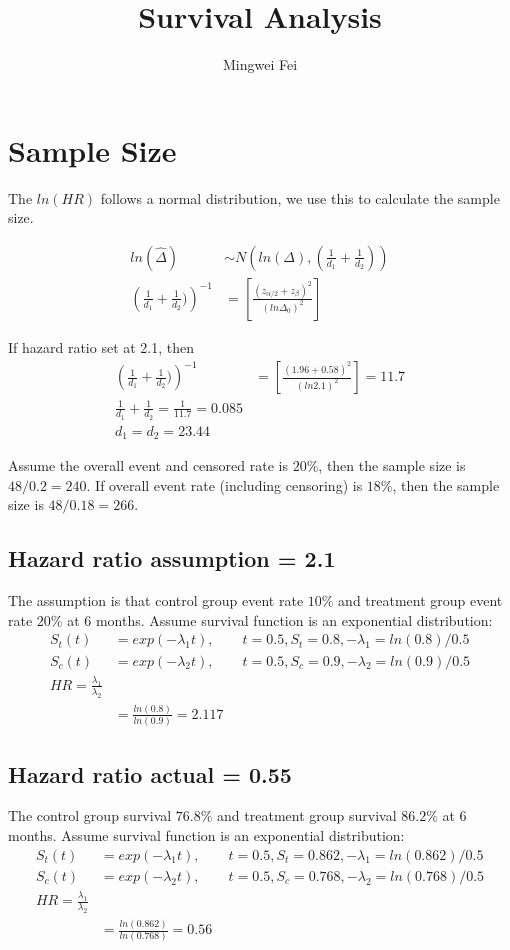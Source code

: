 \documentclass[11pt]{article} %
\title{Survival Analysis}
\author{Mingwei Fei}
\begin{document}
	
	\maketitle
	
	\section{Sample Size}
	The $ln(HR)$ follows a normal distribution, we use this to calculate the sample size.
	
	\begin{align*}
	ln (\hat{\Delta}) & \sim N(ln(\Delta), \left( \frac{1}{d_1} + \frac{1}{d_2} \right)) \\
	\left( \frac{1}{d_1} + \frac{1}{d_2} )\right)^{-1} &= \left[ \frac{(z_{\alpha/2} + z_{\beta})^2}{(ln \Delta_0)^2} \right] 
	\end{align*}
	
	If hazard ratio set at 2.1, then 
	\begin{align*}
	\left( \frac{1}{d_1} + \frac{1}{d_2} )\right)^{-1} &= \left[ \frac{(1.96 + 0.58)^2}{(ln 2.1)^2} \right] = 11.7\\
	\frac{1}{d_1} + \frac{1}{d_2} = \frac{1}{11.7} = 0.085\\
	d_1 = d_2 = 23.44
	\end{align*}
	
	Assume the overall event and censored rate is $20\%$, then the sample size is $48/0.2 = 240$. If overall event rate (including censoring) is $18\%$, then the sample size is $48/0.18 = 266$.
	
	\subsection{Hazard ratio assumption = 2.1}
	The assumption is that control group event rate $10\%$ and treatment group event rate $20\%$ at 6 months. 
	Assume survival function is an exponential distribution:
	\begin{align*}
	S_t(t) &= exp(-\lambda_1 t), \qquad t= 0.5, S_t = 0.8 , -\lambda_1 = ln(0.8)/0.5\\
	S_c(t) &=  exp(-\lambda_2 t), \qquad t= 0.5, S_c = 0.9, -\lambda_2 = ln(0.9)/0.5  \\
	HR = \frac{\lambda_1}{\lambda_2}\\
	&= \frac{ln(0.8)}{ln(0.9)} = 2.117
	\end{align*}	

	\subsection{Hazard ratio actual = 0.55}
The control group survival $76.8\%$ and treatment group survival $86.2\%$ at 6 months. 
Assume survival function is an exponential distribution:
\begin{align*}
	S_t(t) &= exp(-\lambda_1 t), \qquad t= 0.5, S_t = 0.862 , -\lambda_1 = ln(0.862)/0.5\\
	S_c(t) &=  exp(-\lambda_2 t), \qquad t= 0.5, S_c = 0.768, -\lambda_2 = ln(0.768)/0.5  \\
	HR = \frac{\lambda_1}{\lambda_2}\\
	&= \frac{ln(0.862)}{ln(0.768)} = 0.56
\end{align*}
\end{document}
